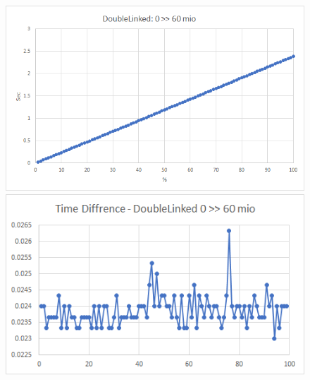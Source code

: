 \documentclass{TUBAFarbeiten}
\begin{document}
\begin{figure}[H]
\label{fig:Linked0-60}
\includegraphics[scale=0.9]{Linked0-60}
\begin{center}
\includegraphics[scale=1]{Linked0-60-Time}
\end{center}
\end{figure}
\end{document}
